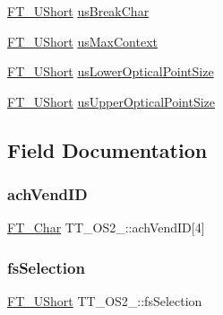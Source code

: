 \begin{DoxyCompactItemize}
\item 
\hyperlink{fttypes_8h_a937f6c17cf5ffd09086d8610c37b9f58}{F\+T\+\_\+\+U\+Short} \hyperlink{struct_t_t___o_s2___a1d47030e246d2593ec3e4cdf66b17161}{us\+Break\+Char}
\item 
\hyperlink{fttypes_8h_a937f6c17cf5ffd09086d8610c37b9f58}{F\+T\+\_\+\+U\+Short} \hyperlink{struct_t_t___o_s2___a167313e407c77db2c4ca5a987f3a1482}{us\+Max\+Context}
\item 
\hyperlink{fttypes_8h_a937f6c17cf5ffd09086d8610c37b9f58}{F\+T\+\_\+\+U\+Short} \hyperlink{struct_t_t___o_s2___a76193c4f0a29357bab8d8d70af10121a}{us\+Lower\+Optical\+Point\+Size}
\item 
\hyperlink{fttypes_8h_a937f6c17cf5ffd09086d8610c37b9f58}{F\+T\+\_\+\+U\+Short} \hyperlink{struct_t_t___o_s2___a8b068c0e31e8c8de527f010b9860d2ae}{us\+Upper\+Optical\+Point\+Size}
\end{DoxyCompactItemize}


\subsection{Field Documentation}
\mbox{\label{struct_t_t___o_s2___a01d027dea4daddaa278ba39c2c957d11}} 
\subsubsection{\texorpdfstring{ach\+Vend\+ID}{achVendID}}
{\footnotesize\ttfamily \hyperlink{fttypes_8h_a0f851552b050883885f0a0855771f39d}{F\+T\+\_\+\+Char} T\+T\+\_\+\+O\+S2\+\_\+\+::ach\+Vend\+ID\mbox{[}4\mbox{]}}

\mbox{\label{struct_t_t___o_s2___a12e9e1f0b21f424715c881d9f4e012ce}} 
\subsubsection{\texorpdfstring{fs\+Selection}{fsSelection}}
{\footnotesize\ttfamily \hyperlink{fttypes_8h_a937f6c17cf5ffd09086d8610c37b9f58}{F\+T\+\_\+\+U\+Short} T\+T\+\_\+\+O\+S2\+\_\+\+::fs\+Selection}

